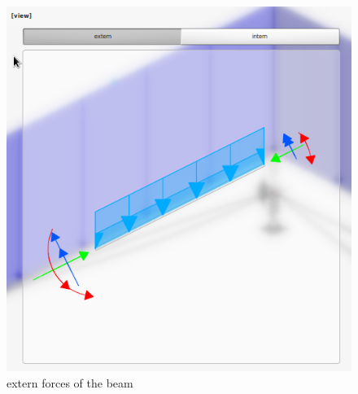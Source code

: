 \documentclass[a4paper,11pt]{report}
\begin{document}
\begin{minipage}[h]{0.5\textwidth-0.5cm}
\begin{figure}[H]
\begin{center}
\includegraphics[width=\textwidth]{../pictures/externforcesdetail.png}
\caption{extern forces of the beam}
\label{pic:externforces}
\end{center}
\end{figure}
\end{minipage}
\hfill
\end{document}
